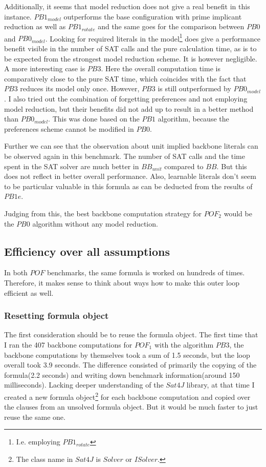 Additionally, it seems that model reduction does not give a real benefit in this instance. $PB1_{model}$ outperforms the base configuration with prime implicant reduction as well as $PB1_{rotate}$ and the same goes for the comparison between $PB0$ and $PB0_{model}$. Looking for required literals in the model\footnote{I.e. employing $PB1_{rotate}$} does give a performance benefit visible in the number of SAT calls and the pure calculation time, as is to be expected from the strongest model reduction scheme. It is however negligible. A more interesting case is $PB3$. Here the overall computation time is comparatively close to the pure SAT time, which coincides with the fact that $PB3$ reduces its model only once. However, $PB3$ is still outperformed by $PB0_{model}$. I also tried out the combination of forgetting preferences and not employing model reduction, but their benefits did not add up to result in a better method than $PB0_{model}$. This was done based on the $PB1$ algorithm, because the preferences scheme cannot be modified in $PB0$.

Further we can see that the observation about unit implied backbone literals can be observed again in this benchmark. The number of SAT calls and the time spent in the SAT solver are much better in $BB_{unit}$ compared to $BB$. But this does not reflect in better overall performance. Also, learnable literals don't seem to be particular valuable in this formula as can be deducted from the results of $PB1e$.

Judging from this, the best backbone computation strategy for $POF_2$ would be the $PB0$ algorithm without any model reduction.











\subsection{Efficiency over all assumptions}
In both $POF$ benchmarks, the same formula is worked on hundreds of times. Therefore, it makes sense to think about ways how to make this outer loop efficient as well.


\subsubsection{Resetting formula object}
The first consideration should be to reuse the formula object. The first time that I ran the 407 backbone computations for $POF_1$ with the algorithm $PB3$, the backbone computations by themselves took a sum of 1.5 seconds, but the loop overall took 3.9 seconds. The difference consisted of primarily the copying of the formula(2.2 seconds) and writing down benchmark information(around 150 milliseconds). Lacking deeper understanding of the $Sat4J$ library, at that time I created a new formula object\footnote{The class name in $Sat4J$ is $Solver$ or $ISolver$.} for each backbone computation and copied over the clauses from an unsolved formula object. But it would be much faster to just reuse the same one.

